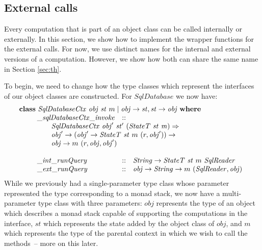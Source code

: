 \subsection{External calls}

Every computation that is part of an object class can be called internally or externally. In this section, we show how to implement the wrapper functions for the external calls. For now, we use distinct names for the internal and external versions of a computation. However, we show how both can share the same name in Section \ref{sec:th}. 

To begin, we need to change how the type classes which represent the interfaces of our object classes are constructed. For $\mathit{SqlDatabase}$ we now have:
\begin{displaymath}
\begin{array}{l}
\mathbf{class}~\mathit{SqlDatabaseCtx}~\mathit{obj}~\mathit{st}~m \mid \mathit{obj} \to \mathit{st}, \mathit{st} \to \mathit{obj}~\mathbf{where}\\
\qquad \begin{array}{lcl}
\mathit{\_\mathit{sqlDatabaseCtx\_invoke}} & :: & \\
\multicolumn{3}{l}{\qquad \mathit{SqlDatabaseCtx}~\mathit{obj}'~\mathit{st}'~(\mathit{StateT}~\mathit{st}~\mathit{m}) \Rightarrow}\\
\multicolumn{3}{l}{\qquad \mathit{obj}' \to (\mathit{obj}' \to \mathit{StateT}~\mathit{st}~m~(r,\mathit{obj}')) \to} \\
\multicolumn{3}{l}{\qquad \mathit{obj} \to m~(r,\mathit{obj},\mathit{obj}')} \\\\
\mathit{\_int\_runQuery} & :: & \mathit{String} \to \mathit{StateT}~\mathit{st}~m~\mathit{SqlReader} \\
\mathit{\_ext\_runQuery} & :: & \mathit{obj} \to \mathit{String} \to m~(\mathit{SqlReader}, \mathit{obj})
\end{array}
\end{array}
\end{displaymath}
While we previously had a single-parameter type class whose parameter represented the type corresponding to a monad stack, we now have a multi-parameter type class with three parameters: $\mathit{obj}$ represents the type of an object which describes a monad stack capable of supporting the computations in the interface, $\mathit{st}$ which represents the state added by the object class of $\mathit{obj}$, and $m$ which represents the type of the parental context in which we wish to call the methods~-- more on this later. 

